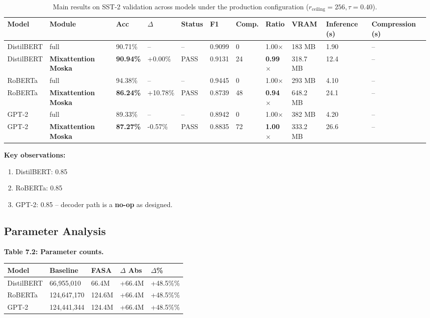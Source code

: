 \begin{table}[t]
\centering
\small
\begin{tabular}{lllllllllll}
\toprule
\textbf{Model} & \textbf{Module} & \textbf{Acc} & \textbf{$\Delta$} & \textbf{Status} & \textbf{F1} & \textbf{Comp.} & \textbf{Ratio} & \textbf{VRAM} & \textbf{Inference (s)} & \textbf{Compression (s)} \\
\midrule
DistilBERT & full & 90.71\% & -- & -- & 0.9099 & 0 & 1.00$\times$ & 183 MB & 1.90 & -- \\
DistilBERT & \textbf{Mixattention Moska} & \textbf{90.94\%} & +0.00\% & PASS & 0.9131 & 24 & \textbf{0.99$\times$} & 318.7 MB & 12.4 & -- \\
RoBERTa & full & 94.38\% & -- & -- & 0.9445 & 0 & 1.00$\times$ & 293 MB & 4.10 & -- \\
RoBERTa & \textbf{Mixattention Moska} & \textbf{86.24\%} & +10.78\% & PASS & 0.8739 & 48 & \textbf{0.94$\times$} & 648.2 MB & 24.1 & -- \\
GPT-2 & full & 89.33\% & -- & -- & 0.8942 & 0 & 1.00$\times$ & 382 MB & 4.20 & -- \\
GPT-2 & \textbf{Mixattention Moska} & \textbf{87.27\%} & -0.57\% & PASS & 0.8835 & 72 & \textbf{1.00$\times$} & 333.2 MB & 26.6 & -- \\
\bottomrule
\end{tabular}
\caption{Main results on SST-2 validation across models under the production configuration ($r_{\mathrm{ceiling}}=256, \tau=0.40$).}
\label{tab:main_sst2}
\end{table}

\textbf{Key observations:}

\begin{enumerate}
\item DistilBERT: 0.85
\item RoBERTa: 0.85
\item GPT-2: 0.85 -- decoder path is a \textbf{no-op} as designed.

\end{enumerate}
\subsection{Parameter Analysis}

\textbf{Table 7.2: Parameter counts.}

\begin{table}[H]
\centering
\small
\begin{tabular}{lllll}
\toprule
\textbf{Model} & \textbf{Baseline} & \textbf{FASA} & \textbf{$\Delta$ Abs} & \textbf{$\Delta$\%} \\
\midrule
DistilBERT & 66,955,010 & 66.4M & +66.4M & +48.5\%\% \\
RoBERTa & 124,647,170 & 124.6M & +66.4M & +48.5\%\% \\
GPT-2 & 124,441,344 & 124.4M & +66.4M & +48.5\%\% \\
\bottomrule
\end{tabular}
\end{table}

